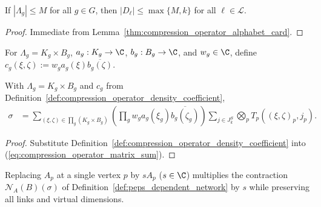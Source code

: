 \begin{lemma}
    \label{thm:compression_operator_alphabet_bound}
    \leanok
    If $|\Lambda_g|\le M$ for all $g\in G$, then $|D_\ell|\le\max\{M,k\}$ for all $\ell\in\mathcal L$.
\end{lemma}

\begin{proof}\leanok
    Immediate from Lemma~\ref{thm:compression_operator_alphabet_card}.
\end{proof}

\begin{definition}
    \label{def:compression_operator_density_coefficient}
    \leanok
    For $\Lambda_g=K_g\times B_g$, $a_g:K_g\to\C$, $b_g:B_g\to\C$, and $w_g\in\C$, define $c_g(\xi,\zeta):=w_g a_g(\xi)\overline{b_g(\zeta)}$.
\end{definition}

\begin{lemma}
    \label{thm:compression_operator_density_pair}
    \leanok
    With $\Lambda_g=K_g\times B_g$ and $c_g$ from Definition~\ref{def:compression_operator_density_coefficient},
    \begin{align}
        \sigma
         & =\sum_{(\xi,\zeta)\in\prod_g(K_g\times B_g)}
        \left(\prod_g w_g a_g(\xi_g)\overline{b_g(\zeta_g)}\right)
        \sum_{j\in J_k^S}\bigotimes_p T_p((\xi,\zeta)_p,j_p).
        \label{eq:compression_operator_density_pair}
    \end{align}
\end{lemma}

\begin{proof}\leanok
    Substitute Definition~\ref{def:compression_operator_density_coefficient} into (\ref{eq:compression_operator_matrix_sum}).
\end{proof}

\begin{lemma}
    \label{thm:peps_dependent_network_scalar}
    \leanok
    Replacing $A_p$ at a single vertex $p$ by $sA_p$ ($s\in\C$) multiplies the contraction $\mathcal N_A(B)(\sigma)$ of Definition~\ref{def:peps_dependent_network} by $s$ while preserving all links and virtual dimensions.
\end{lemma}

